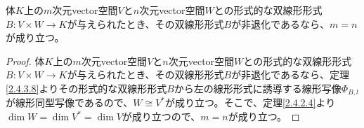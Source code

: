 \documentclass[dvipdfmx]{jsarticle}
\begin{document}
\begin{thm}\label{2.4.3.9}
体$K$上の$m$次元vector空間$V$と$n$次元vector空間$W$との形式的な双線形形式$B:V \times W \rightarrow K$が与えられたとき、その双線形形式$B$が非退化であるなら、$m = n$が成り立つ。
\end{thm}
\begin{proof}
体$K$上の$m$次元vector空間$V$と$n$次元vector空間$W$との形式的な双線形形式$B:V \times W \rightarrow K$が与えられたとき、その双線形形式$B$が非退化であるなら、定理\ref{2.4.3.8}よりその形式的な双線形形式$B$から左の線形形式に誘導する線形写像$\varPhi_{B,l}$が線形同型写像であるので、$W \cong V^{*}$が成り立つ。そこで、定理\ref{2.4.2.4}より$\dim W = \dim V^{*} = \dim V$が成り立つので、$m = n$が成り立つ。
\end{proof}
\end{document}
